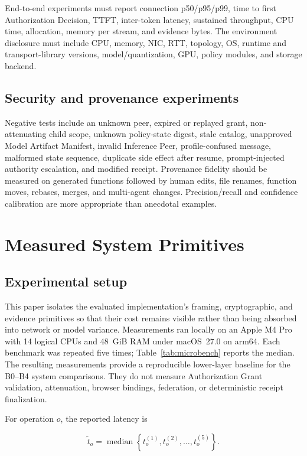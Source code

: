 \documentclass[10pt]{article}
\begin{document}
End-to-end experiments must report connection p50/p95/p99, time to first Authorization Decision, TTFT, inter-token latency, sustained throughput, CPU time, allocation, memory per stream, and evidence bytes. The environment disclosure must include CPU, memory, NIC, RTT, topology, OS, runtime and transport-library versions, model/quantization, GPU, policy modules, and storage backend.

\subsection{Security and provenance experiments}

Negative tests include an unknown peer, expired or replayed grant, non-attenuating child scope, unknown policy-state digest, stale catalog, unapproved Model Artifact Manifest, invalid Inference Peer, profile-confused message, malformed state sequence, duplicate side effect after resume, prompt-injected authority escalation, and modified receipt. Provenance fidelity should be measured on generated functions followed by human edits, file renames, function moves, rebases, merges, and multi-agent changes. Precision/recall and confidence calibration are more appropriate than anecdotal examples.

\section{Measured System Primitives}

\subsection{Experimental setup}

This paper isolates the evaluated implementation's framing, cryptographic, and evidence primitives so that their cost remains visible rather than being absorbed into network or model variance. Measurements ran locally on an Apple M4 Pro with 14 logical CPUs and 48~GiB RAM under macOS~27.0 on arm64. Each benchmark was repeated five times; Table~\ref{tab:microbench} reports the median. The resulting measurements provide a reproducible lower-layer baseline for the B0--B4 system comparisons. They do not measure Authorization Grant validation, attenuation, browser bindings, federation, or deterministic receipt finalization.

For operation $o$, the reported latency is

\begin{equation}
\widetilde{t}_o = \operatorname{median}
  \left\{t_o^{(1)},t_o^{(2)},\ldots,t_o^{(5)}\right\}.
\label{eq:median}
\end{equation}
\end{document}
